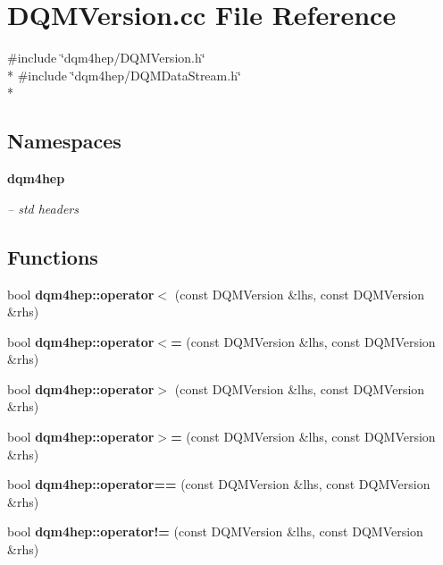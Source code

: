 \section{D\+Q\+M\+Version.\+cc File Reference}
\label{DQMVersion_8cc}
{\ttfamily \#include \char`\"{}dqm4hep/\+D\+Q\+M\+Version.\+h\char`\"{}}\\*
{\ttfamily \#include \char`\"{}dqm4hep/\+D\+Q\+M\+Data\+Stream.\+h\char`\"{}}\\*
\subsection*{Namespaces}
\begin{DoxyCompactItemize}
\item 
 {\bf dqm4hep}
\begin{DoxyCompactList}\small\item\em -- std headers \end{DoxyCompactList}\end{DoxyCompactItemize}
\subsection*{Functions}
\begin{DoxyCompactItemize}
\item 
bool {\bf dqm4hep\+::operator$<$} (const D\+Q\+M\+Version \&lhs, const D\+Q\+M\+Version \&rhs)
\item 
bool {\bf dqm4hep\+::operator$<$=} (const D\+Q\+M\+Version \&lhs, const D\+Q\+M\+Version \&rhs)
\item 
bool {\bf dqm4hep\+::operator$>$} (const D\+Q\+M\+Version \&lhs, const D\+Q\+M\+Version \&rhs)
\item 
bool {\bf dqm4hep\+::operator$>$=} (const D\+Q\+M\+Version \&lhs, const D\+Q\+M\+Version \&rhs)
\item 
bool {\bf dqm4hep\+::operator==} (const D\+Q\+M\+Version \&lhs, const D\+Q\+M\+Version \&rhs)
\item 
bool {\bf dqm4hep\+::operator!=} (const D\+Q\+M\+Version \&lhs, const D\+Q\+M\+Version \&rhs)
\end{DoxyCompactItemize}
